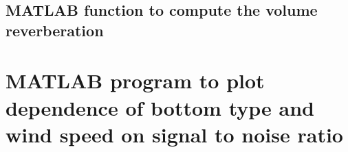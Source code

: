\subsection{ MATLAB function to compute the volume reverberation} \label{ MATLAB function to compute the volume reverberation}


\section{ MATLAB program to plot dependence of bottom type and wind speed on signal to noise ratio } \label{ MATLAB program to plot dependence of bottom type and wind speed on signal to noise ratio }




